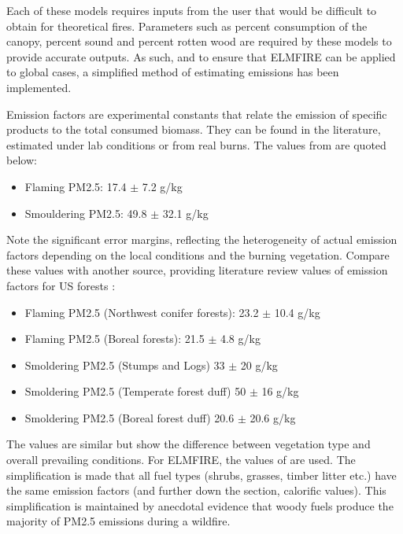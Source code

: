 Each of these models requires inputs from the user that would be difficult to obtain for theoretical fires. Parameters such as percent consumption of the canopy, percent sound and percent rotten wood are required by these models to provide accurate outputs. As such, and to ensure that ELMFIRE can be applied to global cases, a simplified method of estimating emissions has been implemented. 

Emission factors are experimental constants that relate the emission of specific products to the total consumed biomass. They can be found in the literature, estimated under lab conditions or from real burns. The values from \cite{reisenGroundBasedFieldMeasurements2018} are quoted below:

\begin{itemize}
    \item Flaming PM2.5: 17.4 $\pm$ 7.2 g/kg
    \item Smouldering PM2.5: 49.8 $\pm$ 32.1 g/kg
\end{itemize}

Note the significant error margins, reflecting the heterogeneity of actual emission factors depending on the local conditions and the burning vegetation. Compare these values with another source, providing literature review values of emission factors for US forests \cite{urbanskiWildlandFireEmissions2014}:

\begin{itemize}
    \item Flaming PM2.5 (Northwest conifer forests): 23.2 $\pm$ 10.4 g/kg
    \item Flaming PM2.5 (Boreal forests): 21.5 $\pm$ 4.8 g/kg
    \item Smoldering PM2.5 (Stumps and Logs) 33 $\pm$ 20 g/kg
    \item Smoldering PM2.5 (Temperate forest duff) 50 $\pm$ 16 g/kg
    \item Smoldering PM2.5 (Boreal forest duff) 20.6 $\pm$ 20.6 g/kg
\end{itemize}

The values are similar but show the difference between vegetation type and overall prevailing conditions. For ELMFIRE, the values of \cite{reisenGroundBasedFieldMeasurements2018} are used. The simplification is made that all fuel types (shrubs, grasses, timber litter etc.) have the same emission factors (and further down the section, calorific values). This simplification is maintained by anecdotal evidence that woody fuels produce the majority of PM2.5 emissions during a wildfire. 

